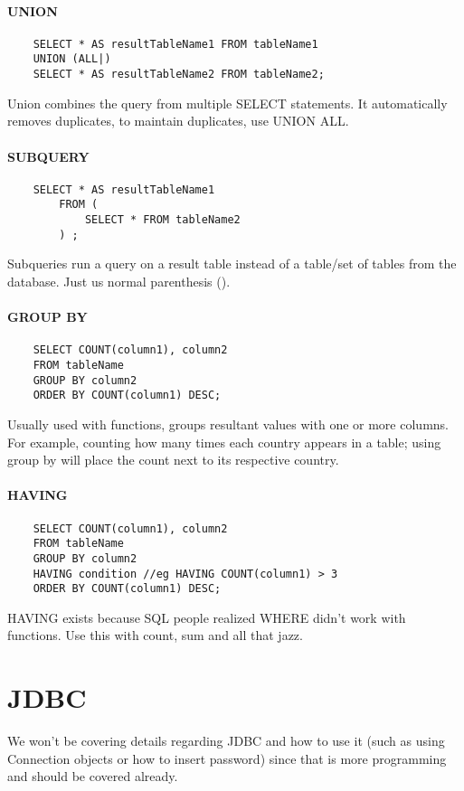 \paragraph{UNION}
\begin{verbatim}
    SELECT * AS resultTableName1 FROM tableName1
    UNION (ALL|)
    SELECT * AS resultTableName2 FROM tableName2;
\end{verbatim}
Union combines the query from multiple SELECT statements. It automatically removes duplicates, to maintain duplicates, use UNION ALL.
\paragraph{SUBQUERY}
\begin{verbatim}
    SELECT * AS resultTableName1 
        FROM (
            SELECT * FROM tableName2
        ) ;
\end{verbatim}
Subqueries run a query on a result table instead of a table/set of tables from the database. Just us normal parenthesis ().
\paragraph{GROUP BY}
\begin{verbatim}
    SELECT COUNT(column1), column2
    FROM tableName
    GROUP BY column2
    ORDER BY COUNT(column1) DESC;
\end{verbatim}
Usually used with functions, groups resultant values with one or more columns. For example, counting how many times each country appears in a table; using group by will place the count next to its respective country.
\paragraph{HAVING}
\begin{verbatim}
    SELECT COUNT(column1), column2
    FROM tableName
    GROUP BY column2
    HAVING condition //eg HAVING COUNT(column1) > 3
    ORDER BY COUNT(column1) DESC;
\end{verbatim}
HAVING exists because SQL people realized WHERE didn't work with functions. Use this with count, sum and all that jazz.
\section{JDBC}
We won't be covering details regarding JDBC and how to use it (such as using Connection objects or how to insert password) since that is more programming and should be covered already.
